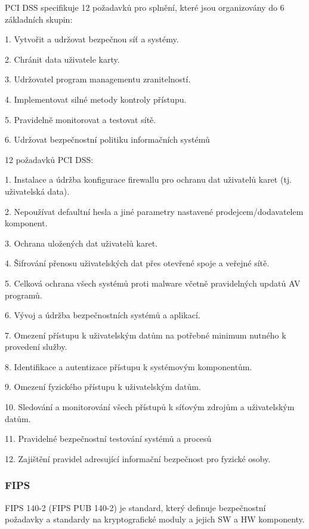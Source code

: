 PCI DSS specifikuje 12 požadavků pro splnění, které jsou organizovány do 6 základních skupin:

1. Vytvořit a udržovat bezpečnou síť a systémy.

2. Chránit data uživatele karty.

3. Udržovatel program managementu zranitelností.

4. Implementovat silné metody kontroly přístupu.

5. Pravidelně monitorovat a testovat sítě.

6. Udržovat bezpečnostní politiku informačních systémů

12 požadavků PCI DSS:

1. Instalace a údržba konfigurace firewallu pro ochranu dat uživatelů karet (tj. uživatelská data).

2. Nepoužívat defaultní hesla a jiné parametry nastavené prodejcem/dodavatelem komponent.

3. Ochrana uložených dat uživatelů karet.

4. Šifrování přenosu uživatelských dat přes otevřené spoje a veřejné sítě.

5. Celková ochrana všech systémů proti malware včetně pravidelných updatů AV programů.

6. Vývoj a údržba bezpečnostních systémů a aplikací.

7. Omezení přístupu k uživatelským datům na potřebné minimum nutného k provedení služby.

8. Identifikace a autentizace přístupu k systémovým komponentům.

9. Omezení fyzického přístupu k uživatelským datům.

10. Sledování a monitorování všech přístupů k síťovým zdrojům a uživatelským datům.

11. Pravidelné bezpečnostní testování systémů a procesů

12. Zajištění pravidel adresující informační bezpečnost pro fyzické osoby. 

\subsubsection{FIPS}
FIPS 140-2 (FIPS PUB 140-2) je standard, který definuje bezpečnostní požadavky a standardy na kryptografické moduly a jejich SW a HW komponenty.

